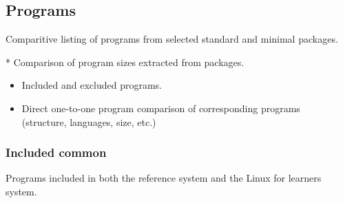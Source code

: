 \subsection{Programs}\label{Programs}

Comparitive listing of programs from selected standard and minimal packages.

* Comparison of program sizes extracted from packages.

\begin{itemize}
    \item Included and excluded programs.
    \item Direct one-to-one program comparison of corresponding programs \\(structure, languages, size, etc.)
\end{itemize}

\newpage

\subsubsection{Included common}

Programs included in both the reference system and the Linux for learners system.

